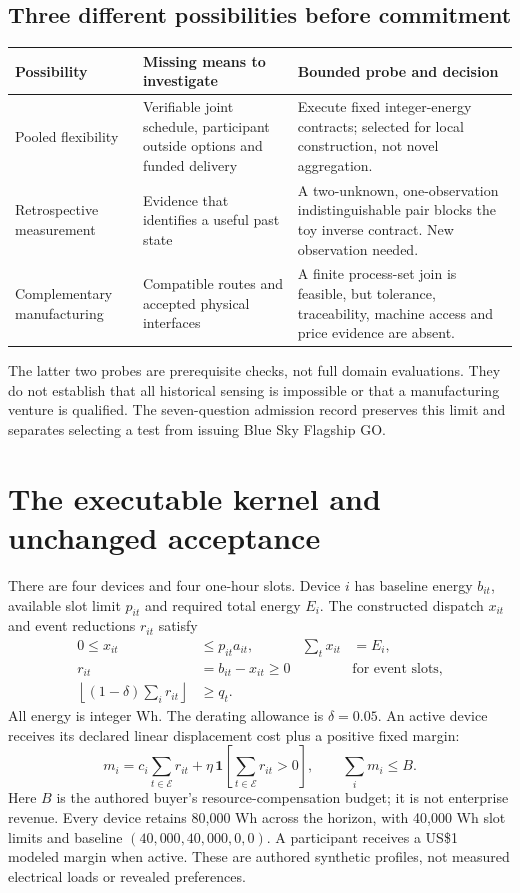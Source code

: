 \documentclass[10pt,a4paper]{article}
\begin{document}
\subsection{Three different possibilities before commitment}
\begin{tabular}{p{.23\linewidth}p{.34\linewidth}p{.35\linewidth}}
\toprule
Possibility & Missing means to investigate & Bounded probe and decision \\
\midrule
Pooled flexibility & Verifiable joint schedule, participant outside options and funded delivery & Execute fixed integer-energy contracts; selected for local construction, not novel aggregation.\\
Retrospective measurement & Evidence that identifies a useful past state & A two-unknown, one-observation indistinguishable pair blocks the toy inverse contract. New observation needed.\\
Complementary manufacturing & Compatible routes and accepted physical interfaces & A finite process-set join is feasible, but tolerance, traceability, machine access and price evidence are absent.\\
\bottomrule
\end{tabular}

The latter two probes are prerequisite checks, not full domain evaluations. They do not establish that all historical sensing is impossible or that a manufacturing venture is qualified. The seven-question admission record preserves this limit and separates selecting a test from issuing Blue Sky Flagship GO.
\newpage

\section{The executable kernel and unchanged acceptance}
There are four devices and four one-hour slots. Device $i$ has baseline energy $b_{it}$, available slot limit $p_{it}$ and required total energy $E_i$. The constructed dispatch $x_{it}$ and event reductions $r_{it}$ satisfy
\begin{align}
0\leq x_{it}&\leq p_{it}a_{it}, & \sum_t x_{it}&=E_i,\\
r_{it}&=b_{it}-x_{it}\geq0 &&\text{for event slots},\\
\left\lfloor(1-\delta)\sum_i r_{it}\right\rfloor&\geq q_t. &&
\end{align}
All energy is integer Wh. The derating allowance is $\delta=0.05$. An active device receives its declared linear displacement cost plus a positive fixed margin:
\begin{equation}
m_i=c_i\sum_{t\in\mathcal E}r_{it}+\eta\,\mathbf 1\left[\sum_{t\in\mathcal E}r_{it}>0\right],\qquad \sum_i m_i\leq B.
\end{equation}
Here $B$ is the authored buyer's resource-compensation budget; it is not enterprise revenue. Every device retains 80,000 Wh across the horizon, with 40,000 Wh slot limits and baseline $(40{,}000,40{,}000,0,0)$. A participant receives a US\$1 modeled margin when active. These are authored synthetic profiles, not measured electrical loads or revealed preferences.
\end{document}
